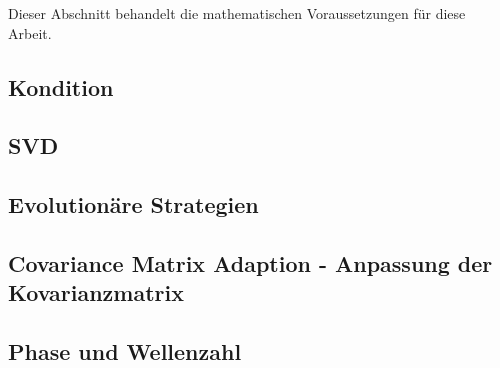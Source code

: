 Dieser Abschnitt behandelt die mathematischen Voraussetzungen für diese Arbeit.
%
\subsection{Kondition}
\label{sec:condition}

%
\subsection{SVD}
\label{sec:svd}

%
\subsection{Evolutionäre Strategien}
\label{sec:es-common}

%
\subsection{Covariance Matrix Adaption - Anpassung der Kovarianzmatrix}
\label{sec:cma-es}

%
\subsection{Phase und Wellenzahl}
\label{sec:wavenumber}


%